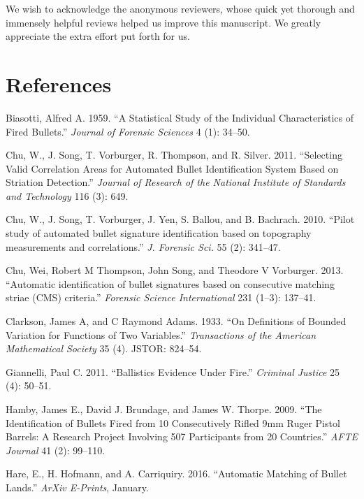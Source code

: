 \documentclass[12pt,]{article}
\theoremstyle{definition}
\theoremstyle{definition}
\theoremstyle{definition}
\theoremstyle{remark}
\begin{document}
We wish to acknowledge the anonymous reviewers, whose quick yet thorough
and immensely helpful reviews helped us improve this manuscript. We
greatly appreciate the extra effort put forth for us.

\clearpage

\section*{References}\label{references}

\hypertarget{refs}{}
\hypertarget{ref-biasotti:1959}{}
Biasotti, Alfred A. 1959. ``A Statistical Study of the Individual
Characteristics of Fired Bullets.'' \emph{Journal of Forensic Sciences}
4 (1): 34--50.

\hypertarget{ref-chu:2011}{}
Chu, W., J. Song, T. Vorburger, R. Thompson, and R. Silver. 2011.
``Selecting Valid Correlation Areas for Automated Bullet Identification
System Based on Striation Detection.'' \emph{Journal of Research of the
National Institute of Standards and Technology} 116 (3): 649.

\hypertarget{ref-chu:2010}{}
Chu, W., J. Song, T. Vorburger, J. Yen, S. Ballou, and B. Bachrach.
2010. ``Pilot study of automated bullet signature identification based
on topography measurements and correlations.'' \emph{J. Forensic Sci.}
55 (2): 341--47.

\hypertarget{ref-thompson:2013}{}
Chu, Wei, Robert M Thompson, John Song, and Theodore V Vorburger. 2013.
``Automatic identification of bullet signatures based on consecutive
matching striae (CMS) criteria.'' \emph{Forensic Science International}
231 (1--3): 137--41.

\hypertarget{ref-clarkson1933definitions}{}
Clarkson, James A, and C Raymond Adams. 1933. ``On Definitions of
Bounded Variation for Functions of Two Variables.'' \emph{Transactions
of the American Mathematical Society} 35 (4). JSTOR: 824--54.

\hypertarget{ref-giannelli:2011}{}
Giannelli, Paul C. 2011. ``Ballistics Evidence Under Fire.''
\emph{Criminal Justice} 25 (4): 50--51.

\hypertarget{ref-hamby:2009}{}
Hamby, James E., David J. Brundage, and James W. Thorpe. 2009. ``The
Identification of Bullets Fired from 10 Consecutively Rifled 9mm Ruger
Pistol Barrels: A Research Project Involving 507 Participants from 20
Countries.'' \emph{AFTE Journal} 41 (2): 99--110.

\hypertarget{ref-2016arXiv160105788H}{}
Hare, E., H. Hofmann, and A. Carriquiry. 2016. ``Automatic Matching of
Bullet Lands.'' \emph{ArXiv E-Prints}, January.
\end{document}
